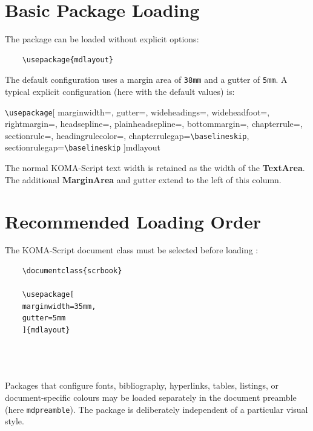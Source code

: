 \documentclass[
11pt,
a4paper,
oneside
]{scrbook}
\begin{document}
\section{Basic Package Loading}

The package can be loaded without explicit options:
\begin{verbatim}
	\usepackage{mdlayout}
\end{verbatim}
The default configuration uses a margin area of \texttt{38mm} and a gutter
of \texttt{5mm}.
A typical explicit configuration (here with the default values) is:
\begin{typewriter}
	\verb|\usepackage|[
	marginwidth=\mdDefaultMarginwidth,
	gutter=\mdDefaultGutter,
	wideheadings=\mdDefaultWideheadings,
	wideheadfoot=\mdDefaultWideheadfoot,
	rightmargin=\mdDefaultRightmargin,
	headsepline=\mdDefaultHeadsepline,
	plainheadsepline=\mdDefaultPlainheadsepline,
	bottommargin=\mdDefaultBottommargin,
	chapterrule=\mdDefaultChapterrule,
	sectionrule=\mdDefaultSectionrule,
	headingrulecolor=\mdDefaultHeadingrulecolor,
	chapterrulegap=\mdDefaultChapterrulegapFactor\verb|\baselineskip|,
	sectionrulegap=\mdDefaultSectionrulegapFactor\verb|\baselineskip|
	]{mdlayout}
\end{typewriter}
The normal KOMA-Script text width is retained as the width of the
\textbf{TextArea}.
The additional \textbf{MarginArea} and gutter extend to the left of this
column.

\section{Recommended Loading Order}

The KOMA-Script document class must be selected before loading
\mdlayout{}:
\begin{verbatim}
	\documentclass{scrbook}
	
	\usepackage[
	marginwidth=35mm,
	gutter=5mm
	]{mdlayout}
	
	
	
\end{verbatim}
Packages that configure fonts, bibliography, hyperlinks, tables, listings,
or document-specific colours may be loaded separately in the document
preamble (here \texttt{mdpreamble}). 
The package is deliberately independent of a particular visual style.

\end{document}
